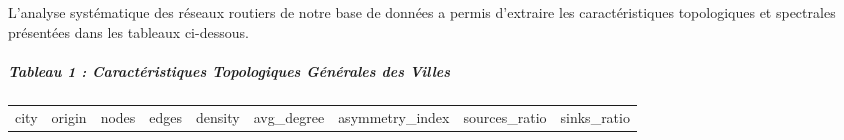 \documentclass[10pt, a4paper]{article}
\newcounter{none}
\begin{document}
L'analyse systématique des réseaux routiers de notre base de données a
permis d'extraire les caractéristiques topologiques et spectrales
présentées dans les tableaux ci-dessous.

\subparagraph{Tableau 1 : Caractéristiques Topologiques Générales des
Villes}\label{tableau-1-caractuxe9ristiques-topologiques-guxe9nuxe9rales-des-villes}

{\def\LTcaptype{none} %
\begin{longtable}[]{@{}
  >{\raggedright\arraybackslash}p{}
  >{\raggedright\arraybackslash}p{}
  >{\raggedleft\arraybackslash}p{}
  >{\raggedleft\arraybackslash}p{}
  >{\raggedleft\arraybackslash}p{}
  >{\raggedleft\arraybackslash}p{}
  >{\raggedleft\arraybackslash}p{}
  >{\raggedleft\arraybackslash}p{}
  >{\raggedleft\arraybackslash}p{}@{}}
\toprule\noalign{}
\begin{minipage}[b]{\linewidth}\raggedright
city
\end{minipage} & \begin{minipage}[b]{\linewidth}\raggedright
origin
\end{minipage} & \begin{minipage}[b]{\linewidth}\raggedleft
nodes
\end{minipage} & \begin{minipage}[b]{\linewidth}\raggedleft
edges
\end{minipage} & \begin{minipage}[b]{\linewidth}\raggedleft
density
\end{minipage} & \begin{minipage}[b]{\linewidth}\raggedleft
avg\_degree
\end{minipage} & \begin{minipage}[b]{\linewidth}\raggedleft
asymmetry\_index
\end{minipage} & \begin{minipage}[b]{\linewidth}\raggedleft
sources\_ratio
\end{minipage} & \begin{minipage}[b]{\linewidth}\raggedleft
sinks\_ratio
\end{minipage} \\

\end{longtable}}
\end{document}
